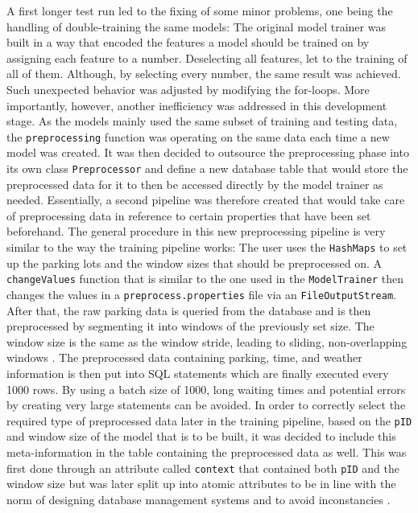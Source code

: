 A first longer test run led to the fixing of some minor problems, one being the handling of double-training the same models: The original model trainer was built in a way that encoded the features a model should be trained on by assigning each feature to a number. Deselecting all features, let to the training of all of them. Although, by selecting every number, the same result was achieved. Such unexpected behavior was adjusted by modifying the for-loops. More importantly, however, another inefficiency was addressed in this development stage. As the models mainly used the same subset of training and testing data, the \texttt{preprocessing} function was operating on the same data each time a new model was created. It was then decided to outsource the preprocessing phase into its own class \texttt{Preprocessor} and define a new database table that would store the preprocessed data for it to then be accessed directly by the model trainer as needed. Essentially, a second pipeline was therefore created that would take care of preprocessing data in reference to certain properties that have been set beforehand. The general procedure in this new preprocessing pipeline is very similar to the way the training pipeline works: The user uses the \texttt{HashMaps} to set up the parking lots and the window sizes that should be preprocessed on. A \texttt{changeValues} function that is similar to the one used in the \texttt{ModelTrainer}  then changes the values in a \texttt{preprocess.properties} file via an \texttt{FileOutputStream}. After that, the raw parking data is queried from the database and is then preprocessed by segmenting it into windows of the previously set size. The window size is the same as the window stride, leading to sliding, non-overlapping windows \cite{dehghani2019}. The preprocessed data containing parking, time, and weather information is then put into SQL statements which are finally executed every 1000 rows. By using a batch size of 1000, long waiting times and potential errors by creating very large statements can be avoided. In order to correctly select the required type of preprocessed data later in the training pipeline, based on the \texttt{pID} and window size of the model that is to be built, it was decided to include this meta-information in the table containing the preprocessed data as well. This was first done through an attribute called \texttt{context} that contained both \texttt{pID} and the window size but was later split up into atomic attributes to be in line with the norm of designing database management systems and to avoid inconstancies \cite{silberschatz2010}.

